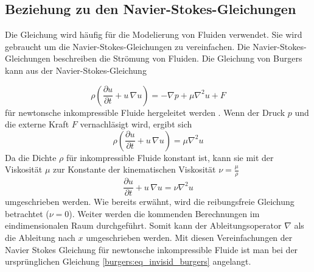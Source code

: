 	\subsection{Beziehung zu den Navier-Stokes-Gleichungen}
		Die Gleichung wird häufig für die Modelierung von Fluiden verwendet.
		Sie wird gebraucht um die Navier-Stokes-Gleichungen zu vereinfachen.
		Die Navier-Stokes-Gleichungen beschreiben die Str\"omung von Fluiden.
		Die Gleichung von Burgers kann aus der Navier-Stokes-Gleichung

		\begin{equation}
			\rho \left(\frac{\partial u}{\partial t} + u \, \nabla u \right) = -\nabla p + \mu \nabla^2 u + F
			\label{burgers:eq_navier}
		\end{equation}
		 f\"ur newtonsche inkompressible Fluide hergeleitet werden \cite{burgers:navier}.
		Wenn der Druck $p$ und die externe Kraft $F$ vernachl\"asigt wird, ergibt sich
		\begin{equation}
			\rho \left(\frac{\partial u}{\partial t} + u \, \nabla u \right) = \mu \nabla^2 u
			 \label{burgers:eq_navier2}
		\end{equation}
		Da die Dichte $\rho$ für inkompressible Fluide konstant ist, kann sie mit der Viskosität $\mu$ zur Konstante der kinematischen Viskosität $\nu = \frac{\mu}{\rho}$
		\begin{equation}
			 \frac{\partial u}{\partial t} + u \,\nabla u = \nu \nabla^2 u
			 \label{burgers:eq_navier3}
		\end{equation}
		umgeschrieben werden.
		Wie bereits erw\"ahnt, wird die reibungsfreie Gleichung betrachtet ($\nu = 0$).
		Weiter werden die kommenden Berechnungen im eindimensionalen Raum durchgef\"uhrt.
		Somit kann der Ableitungsoperator $\nabla$ als die Ableitung nach $x$ umgeschrieben werden.
		Mit diesen Vereinfachungen der Navier Stokes Gleichung f\"ur newtonsche inkompressible Fluide ist man bei der urspr\"unglichen Gleichung \eqref{burgers:eq_invisid_burgers} angelangt.

